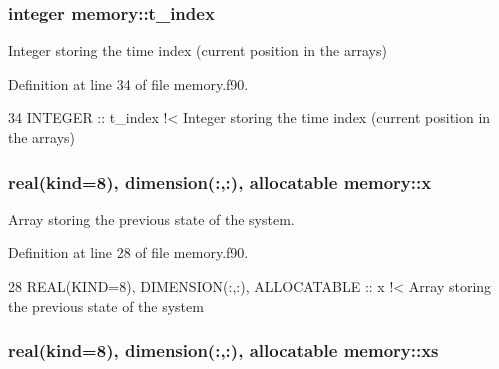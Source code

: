 \subsubsection[{\texorpdfstring{t\+\_\+index}{t_index}}]{\setlength{\rightskip}{0pt plus 5cm}integer memory\+::t\+\_\+index\hspace{0.3cm}{\ttfamily [private]}}\hypertarget{namespacememory_a44d4dddcb5f5cbcbab4164c85448193d}{}\label{namespacememory_a44d4dddcb5f5cbcbab4164c85448193d}


Integer storing the time index (current position in the arrays) 



Definition at line 34 of file memory.\+f90.


\begin{DoxyCode}
34   \textcolor{keywordtype}{INTEGER} :: t\_index\textcolor{comment}{ !< Integer storing the time index (current position in the arrays)}
\end{DoxyCode}
\subsubsection[{\texorpdfstring{x}{x}}]{\setlength{\rightskip}{0pt plus 5cm}real(kind=8), dimension(\+:,\+:), allocatable memory\+::x\hspace{0.3cm}{\ttfamily [private]}}\hypertarget{namespacememory_aa7e328e0fcaf0f4fdf9dc450ccfdfd5b}{}\label{namespacememory_aa7e328e0fcaf0f4fdf9dc450ccfdfd5b}


Array storing the previous state of the system. 



Definition at line 28 of file memory.\+f90.


\begin{DoxyCode}
28   \textcolor{keywordtype}{REAL(KIND=8)}, \textcolor{keywordtype}{DIMENSION(:,:)}, \textcolor{keywordtype}{ALLOCATABLE} :: x\textcolor{comment}{ !< Array storing the previous state of the system}
\end{DoxyCode}
\subsubsection[{\texorpdfstring{xs}{xs}}]{\setlength{\rightskip}{0pt plus 5cm}real(kind=8), dimension(\+:,\+:), allocatable memory\+::xs\hspace{0.3cm}{\ttfamily [private]}}\hypertarget{namespacememory_ab57f9b5df41de423255f146f2cf3220a}{}\label{namespacememory_ab57f9b5df41de423255f146f2cf3220a}


